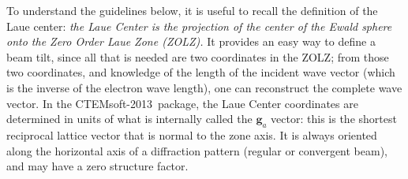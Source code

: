 \documentclass[DIV=calc, paper=letter, fontsize=11pt]{scrartcl}	 %
\newcommand{\ctp}{\textsf{CTEMsoft-2013}}
\begin{document}
To understand the guidelines below, it is useful to recall the definition of the Laue center: \textit{the Laue Center is the projection
of the center of the Ewald sphere onto the Zero Order Laue Zone (ZOLZ).}  It provides an easy way to define a beam tilt, since all
that is needed are two coordinates in the ZOLZ; from those two coordinates, and knowledge of the length of the incident wave vector (which
is the inverse of the electron wave length), one can reconstruct the complete wave vector.  In the \ctp\ package, the Laue Center coordinates
are determined in units of what is internally called the $\mathbf{g}_a$ vector: this is the shortest reciprocal lattice vector that is normal
to the zone axis.  It is always oriented along the horizontal axis of a diffraction pattern (regular or convergent beam), and may have a zero structure
factor.
\end{document}
